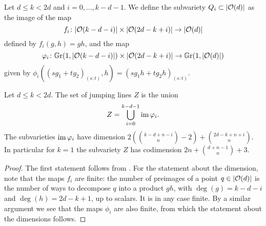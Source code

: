 \begin{definition} \label{helping-varieties}
	Let $d\leq k<2d$ and  $i=0,\dotsc,k-d-1$. We define the subvariety $Q_i \subset \lvert\mathcal{O}(d)\rvert$ as the image of the map
	\[
		f_i\colon \lvert\mathcal{O}(k-d-i)\rvert \times \lvert\mathcal{O}(2d-k+i)\rvert \to \lvert\mathcal{O}(d)\rvert
	\]
	defined by $f_i(g,h)=gh$, and the map
	\[
		\varphi_i
		\colon \mathbb G \mathrm r(1,\lvert\mathcal{O}(k-d-i)\rvert)
		\times \lvert\mathcal{O}(2d-k+i)\rvert
		\to \mathbb G \mathrm r(1,\lvert\mathcal{O}(d)\rvert)
	\]
	given by $\phi_i((s g_1 + t g_2)_{(s:t)},h) = (sg_1 h + tg_2 h)_{(s:t)}$.
\end{definition}

\begin{proposition} \label{description-jumping-lines-as-reduction}
	Let $d\leq k<2d$. The set of jumping lines $Z$ is the union
	\[
		Z = \bigcup_{i=0}^{k-d-1} \operatorname{im}{\varphi_i}.
	\]
	The subvarieties $\operatorname{im}{\varphi_i}$ have dimension $2(\binom{k-d+n-i}{n}-2) + \binom{2d-k+n+i}{n}$. In particular for $k=1$ the subvariety $Z$ has codimension $2n+\binom{d+n-1}{n}+3$.
\end{proposition}

\begin{proof}
	The first statement follows from . For the statement about the dimension, note that the maps $f_i$ are finite: the number of preimages of a point $q\in \lvert\mathcal{O}(d)\rvert$ is the number of ways to decompose $q$ into a product $gh$, with $\deg(g)=k-d-i$ and $\deg(h)=2d-k+1$, up to scalars. It is in any case finite. By a similar argument we see that the maps $\phi_i$ are also finite, from which the statement about the dimensions follows.
\end{proof}